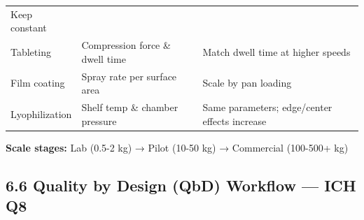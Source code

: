 \documentclass[
  11pt,
  a4paper,
]{report}
\begin{document}
\begin{longtable}[]{@{}lll@{}}
\begin{minipage}[t]{0.20\columnwidth}
Keep constant\strut
\end{minipage}\tabularnewline
\begin{minipage}[t]{0.32\columnwidth}\raggedright
Tableting\strut
\end{minipage} & \begin{minipage}[t]{0.39\columnwidth}\raggedright
Compression force \& dwell time\strut
\end{minipage} & \begin{minipage}[t]{0.20\columnwidth}\raggedright
Match dwell time at higher speeds\strut
\end{minipage}\tabularnewline
\begin{minipage}[t]{0.32\columnwidth}\raggedright
Film coating\strut
\end{minipage} & \begin{minipage}[t]{0.39\columnwidth}\raggedright
Spray rate per surface area\strut
\end{minipage} & \begin{minipage}[t]{0.20\columnwidth}\raggedright
Scale by pan loading\strut
\end{minipage}\tabularnewline
\begin{minipage}[t]{0.32\columnwidth}\raggedright
Lyophilization\strut
\end{minipage} & \begin{minipage}[t]{0.39\columnwidth}\raggedright
Shelf temp \& chamber pressure\strut
\end{minipage} & \begin{minipage}[t]{0.20\columnwidth}\raggedright
Same parameters; edge/center effects increase\strut
\end{minipage}\tabularnewline
\bottomrule
\end{longtable}

\textbf{Scale stages:} Lab (0.5-2 kg) → Pilot (10-50 kg) → Commercial
(100-500+ kg)

\hypertarget{quality-by-design-qbd-workflow-ich-q8}{%
\subsection{6.6 Quality by Design (QbD) Workflow --- ICH
Q8}\label{quality-by-design-qbd-workflow-ich-q8}}
\end{document}
